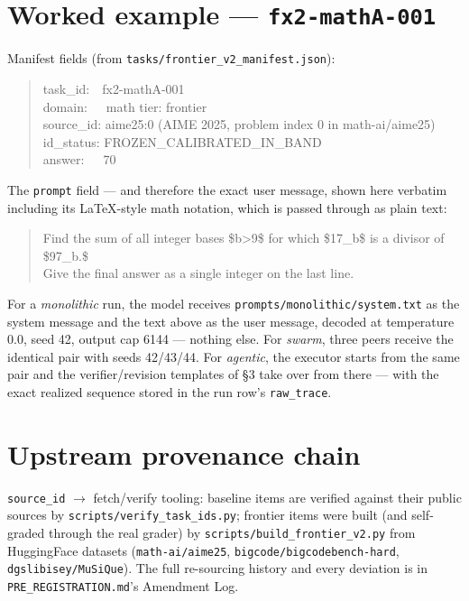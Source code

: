 \documentclass[11pt]{article}
\newcommand{\field}[1]{\texttt{#1}}
\begin{document}
\section{Worked example --- \texttt{fx2-mathA-001}}

Manifest fields (from \texttt{tasks/frontier\_v2\_manifest.json}):

\begin{quote}\ttfamily\small
task\_id:\ \ fx2-mathA-001\\
domain:\ \ \ math \quad tier: frontier\\
source\_id: aime25:0 \quad (AIME 2025, problem index 0 in math-ai/aime25)\\
id\_status: FROZEN\_CALIBRATED\_IN\_BAND\\
answer:\ \ \ 70
\end{quote}

The \field{prompt} field --- and therefore the exact user message, shown here
verbatim including its LaTeX-style math notation, which is passed through as
plain text:

\begin{quote}\ttfamily\small
Find the sum of all integer bases \$b>9\$ for which \$17\_b\$ is a divisor of \$97\_b.\$\\[4pt]
Give the final answer as a single integer on the last line.
\end{quote}

For a \emph{monolithic} run, the model receives
\texttt{prompts/monolithic/system.txt} as the system message and the text above
as the user message, decoded at temperature 0.0, seed 42, output cap 6144 ---
nothing else. For \emph{swarm}, three peers receive the identical pair with seeds
42/43/44. For \emph{agentic}, the executor starts from the same pair and the
verifier/revision templates of \S3 take over from there --- with the exact
realized sequence stored in the run row's \field{raw\_trace}.

\section*{Upstream provenance chain}

\texttt{source\_id} $\rightarrow$ fetch/verify tooling: baseline items are
verified against their public sources by \texttt{scripts/verify\_task\_ids.py};
frontier items were built (and self-graded through the real grader) by
\texttt{scripts/build\_frontier\_v2.py} from HuggingFace datasets
(\texttt{math-ai/aime25}, \texttt{bigcode/bigcodebench-hard},
\texttt{dgslibisey/MuSiQue}). The full re-sourcing history and every deviation is
in \texttt{PRE\_REGISTRATION.md}'s Amendment Log.
\end{document}
